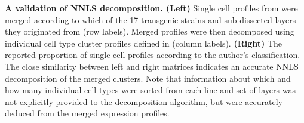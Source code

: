 \textbf{A validation of NNLS decomposition. (Left)} Single cell profiles from \cite{Tasic_2016} were merged according to which of the 17 transgenic strains and sub-dissected layers they originated from (row labels). Merged profiles were then decomposed using individual cell type cluster profiles defined in \cite{Tasic_2016} (column labels). \textbf{(Right)} The reported proportion of single cell profiles according to the author's classification. The close similarity between left and right matrices indicates an accurate NNLS decomposition of the merged clusters. Note that information about which and how many individual cell types were sorted from each line and set of layers was not explicitly provided to the decomposition algorithm, but were accurately deduced from the merged expression profiles.
